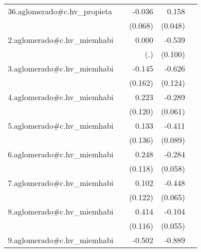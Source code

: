 {\begin{longtable}{l*{4}{D{.}{.}{-1}}}
\addlinespace
36.aglomerado#c.hv\_propieta&                     &      -0.036         &       0.158\sym{***}&                     \\
            &                     &     (0.068)         &     (0.048)         &                     \\
\addlinespace
2.aglomerado#c.hv\_miemhabi&                     &       0.000         &      -0.539\sym{***}&                     \\
            &                     &         (.)         &     (0.100)         &                     \\
\addlinespace
3.aglomerado#c.hv\_miemhabi&                     &      -0.145         &      -0.626\sym{***}&                     \\
            &                     &     (0.162)         &     (0.124)         &                     \\
\addlinespace
4.aglomerado#c.hv\_miemhabi&                     &       0.223         &      -0.289\sym{***}&                     \\
            &                     &     (0.120)         &     (0.061)         &                     \\
\addlinespace
5.aglomerado#c.hv\_miemhabi&                     &       0.133         &      -0.411\sym{***}&                     \\
            &                     &     (0.136)         &     (0.089)         &                     \\
\addlinespace
6.aglomerado#c.hv\_miemhabi&                     &       0.248\sym{*}  &      -0.284\sym{***}&                     \\
            &                     &     (0.118)         &     (0.058)         &                     \\
\addlinespace
7.aglomerado#c.hv\_miemhabi&                     &       0.102         &      -0.448\sym{***}&                     \\
            &                     &     (0.122)         &     (0.065)         &                     \\
\addlinespace
8.aglomerado#c.hv\_miemhabi&                     &       0.414\sym{***}&      -0.104         &                     \\
            &                     &     (0.116)         &     (0.055)         &                     \\
\addlinespace
9.aglomerado#c.hv\_miemhabi&                     &      -0.502\sym{***}&      -0.889\sym{***}&                     \\

\end{longtable}}
